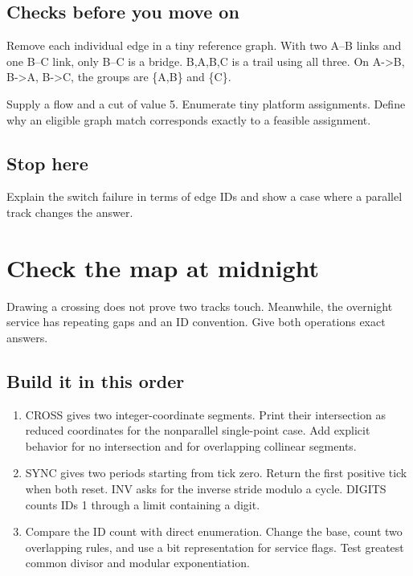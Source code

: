\documentclass[11pt,letterpaper]{article}
\begin{document}
\subsection*{Checks before you move on}

Remove each individual edge in a tiny reference graph. With two A--B links and one B--C link, only B--C is a bridge. B,A,B,C is a trail using all three. On A->B, B->A, B->C, the groups are \{A,B\} and \{C\}.

Supply a flow and a cut of value 5. Enumerate tiny platform assignments. Define why an eligible graph match corresponds exactly to a feasible assignment.

\subsection*{Stop here}

Explain the switch failure in terms of edge IDs and show a case where a parallel track changes the answer.

\clearpage

\section{Check the map at midnight}\label{trains:09}

Drawing a crossing does not prove two tracks touch. Meanwhile, the overnight service has repeating gaps and an ID convention. Give both operations exact answers.

\subsection*{Build it in this order}

\begin{enumerate}
\item CROSS gives two integer-coordinate segments. Print their intersection as reduced coordinates for the nonparallel single-point case. Add explicit behavior for no intersection and for overlapping collinear segments.
\item SYNC gives two periods starting from tick zero. Return the first positive tick when both reset. INV asks for the inverse stride modulo a cycle. DIGITS counts IDs 1 through a limit containing a digit.
\item Compare the ID count with direct enumeration. Change the base, count two overlapping rules, and use a bit representation for service flags. Test greatest common divisor and modular exponentiation.
\end{enumerate}
\end{document}
